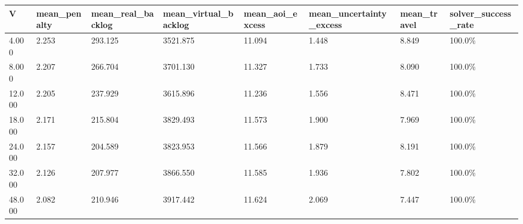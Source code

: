 \begin{tabular}{llllllll}
\toprule
V & mean_penalty & mean_real_backlog & mean_virtual_backlog & mean_aoi_excess & mean_uncertainty_excess & mean_travel & solver_success_rate \\
\midrule
4.000 & 2.253 & 293.125 & 3521.875 & 11.094 & 1.448 & 8.849 & 100.0\% \\
8.000 & 2.207 & 266.704 & 3701.130 & 11.327 & 1.733 & 8.090 & 100.0\% \\
12.000 & 2.205 & 237.929 & 3615.896 & 11.236 & 1.556 & 8.471 & 100.0\% \\
18.000 & 2.171 & 215.804 & 3829.493 & 11.573 & 1.900 & 7.969 & 100.0\% \\
24.000 & 2.157 & 204.589 & 3823.953 & 11.566 & 1.879 & 8.191 & 100.0\% \\
32.000 & 2.126 & 207.977 & 3866.550 & 11.585 & 1.936 & 7.802 & 100.0\% \\
48.000 & 2.082 & 210.946 & 3917.442 & 11.624 & 2.069 & 7.447 & 100.0\% \\
\bottomrule
\end{tabular}
